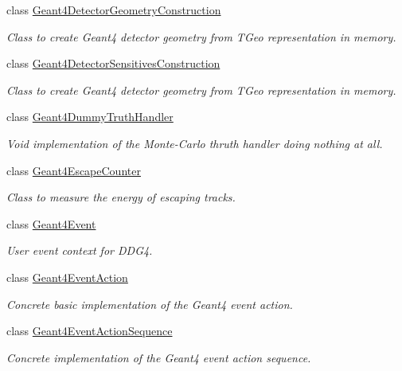 \begin{DoxyCompactItemize}
class \hyperlink{class_d_d4hep_1_1_simulation_1_1_geant4_detector_geometry_construction}{Geant4\+Detector\+Geometry\+Construction}
\begin{DoxyCompactList}\small\item\em Class to create Geant4 detector geometry from T\+Geo representation in memory. \end{DoxyCompactList}\item 
class \hyperlink{class_d_d4hep_1_1_simulation_1_1_geant4_detector_sensitives_construction}{Geant4\+Detector\+Sensitives\+Construction}
\begin{DoxyCompactList}\small\item\em Class to create Geant4 detector geometry from T\+Geo representation in memory. \end{DoxyCompactList}\item 
class \hyperlink{class_d_d4hep_1_1_simulation_1_1_geant4_dummy_truth_handler}{Geant4\+Dummy\+Truth\+Handler}
\begin{DoxyCompactList}\small\item\em Void implementation of the Monte-\/\+Carlo thruth handler doing nothing at all. \end{DoxyCompactList}\item 
class \hyperlink{class_d_d4hep_1_1_simulation_1_1_geant4_escape_counter}{Geant4\+Escape\+Counter}
\begin{DoxyCompactList}\small\item\em Class to measure the energy of escaping tracks. \end{DoxyCompactList}\item 
class \hyperlink{class_d_d4hep_1_1_simulation_1_1_geant4_event}{Geant4\+Event}
\begin{DoxyCompactList}\small\item\em User event context for D\+D\+G4. \end{DoxyCompactList}\item 
class \hyperlink{class_d_d4hep_1_1_simulation_1_1_geant4_event_action}{Geant4\+Event\+Action}
\begin{DoxyCompactList}\small\item\em Concrete basic implementation of the Geant4 event action. \end{DoxyCompactList}\item 
class \hyperlink{class_d_d4hep_1_1_simulation_1_1_geant4_event_action_sequence}{Geant4\+Event\+Action\+Sequence}
\begin{DoxyCompactList}\small\item\em Concrete implementation of the Geant4 event action sequence. \end{DoxyCompactList}\item 

\end{DoxyCompactItemize}
